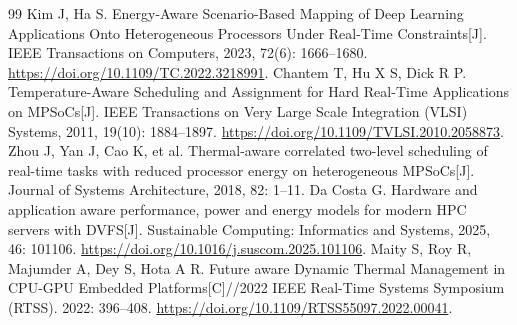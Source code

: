 \documentclass[UTF8,a4paper,12pt,openany,fontset=windows]{ctexbook}
\begin{document}
\setcounter{chapter}{2}

\begin{thebibliography}{99}
Kim J, Ha S.
Energy-Aware Scenario-Based Mapping of Deep Learning Applications Onto Heterogeneous Processors Under Real-Time Constraints[J].
IEEE Transactions on Computers, 2023, 72(6): 1666--1680.
\url{https://doi.org/10.1109/TC.2022.3218991}.
Chantem T, Hu X S, Dick R P.
Temperature-Aware Scheduling and Assignment for Hard Real-Time Applications on MPSoCs[J].
IEEE Transactions on Very Large Scale Integration (VLSI) Systems, 2011, 19(10): 1884--1897.
\url{https://doi.org/10.1109/TVLSI.2010.2058873}.
Zhou J, Yan J, Cao K, et al.
Thermal-aware correlated two-level scheduling of real-time tasks with reduced processor energy on heterogeneous MPSoCs[J].
Journal of Systems Architecture, 2018, 82: 1--11.
Da Costa G.
Hardware and application aware performance, power and energy models for modern HPC servers with DVFS[J].
Sustainable Computing: Informatics and Systems, 2025, 46: 101106.
\url{https://doi.org/10.1016/j.suscom.2025.101106}.
Maity S, Roy R, Majumder A, Dey S, Hota A R.
Future aware Dynamic Thermal Management in CPU-GPU Embedded Platforms[C]//2022 IEEE Real-Time Systems Symposium (RTSS).
2022: 396--408.
\url{https://doi.org/10.1109/RTSS55097.2022.00041}.
\end{thebibliography}
\end{document}
